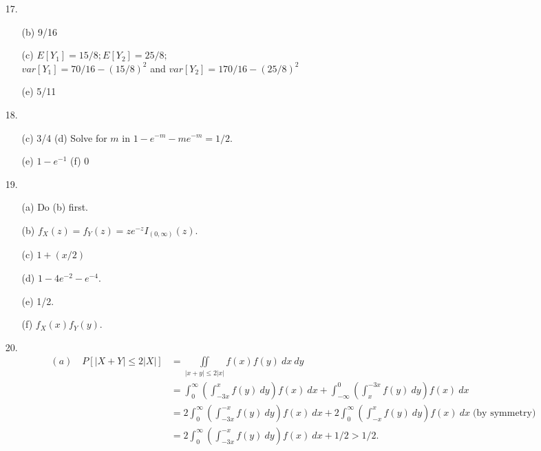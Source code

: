 \begin{enumerate}
	\item[17.] ${}$\vspace{-7.0ex} \begin{itemize}
		\item[(b)] 9/16
		\item[(c)] $E[Y_1] = 15/8; E[Y_2] = 25/8;$ \\ $var[Y_1] = 70/16 - (15/8)^2$ and $var[Y_2] = 170/16 - (25/8)^2$
		\item[(e)] 5/11
	\end{itemize}

	\item[18.] ${}$\vspace{-7.0ex} \begin{itemize}
		\item[(c)] 3/4\;\; (d) Solve for $m$ in $1 - e^{-m} - me^{-m} = 1/2.$ 
		\item[(e)] $1-e^{-1}$ \;\; (f) 0
	\end{itemize}

	\item[19.] ${}$\vspace{-7.0ex} \begin{itemize}
		\item[(a)] Do (b) first.
		\item[(b)] $f_X(z) = f_Y(z) = ze^{-z}I_{(0,\infty)}(z).$
		\item[(c)] $1 + (x/2)$ 
		\item[(d)] $1 - 4e^{-2} - e^{-4}.$ 
		\item[(e)] 1/2.
		\item[(f)] $f_X(x)f_Y(y).$
	\end{itemize}
	
	\newpage
	\item[20.] ${}$\vspace{-7.0ex} \begin{align*}
		(a)\quad P[\vert X + Y\vert \le 2\vert X\vert] &= \displaystyle \iint\limits_{\vert x+y\vert \le 2\vert x\vert}f(x)f(y)\ dx\ dy \\
		&= \displaystyle \int_0^\infty\left(\int_{-3x}^x f(y)\ dy\right) f(x)\ dx + \int_{-\infty}^0 \left(\int_x^{-3x} f(y)\ dy\right) f(x)\ dx \\
		&=  \displaystyle 2\int_0^\infty\left(\int_{-3x}^{-x} f(y)\ dy\right) f(x)\ dx + 2\int_0^{\infty} \left(\int_{-x}^x f(y)\ dy\right) f(x)\ dx\; \text{(by symmetry)} \\
		&= \displaystyle 2\int_0^\infty\left(\int_{-3x}^{-x} f(y)\ dy\right) f(x)\ dx + 1/2 > 1/2.
		\end{align*}


\end{enumerate}
